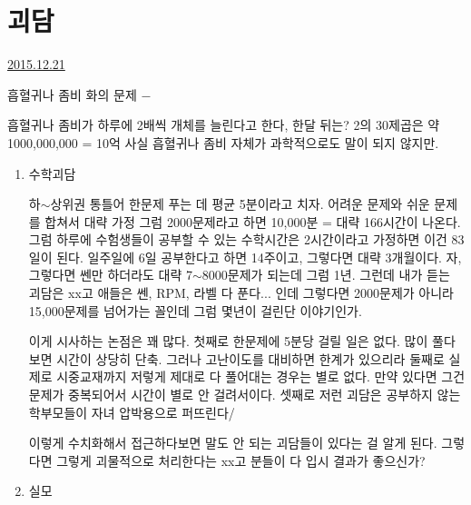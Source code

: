 


\section{괴담}
\href{https://www.kockoc.com/Apoc/556127}{2015.12.21}

\vspace{5mm}

흡혈귀나 좀비 화의 문제 $-$
\vspace{5mm}

흡혈귀나 좀비가 하루에 2배씩 개체를 늘린다고 한다, 한달 뒤는?
2의 30제곱은 약 1000,000,000 = 10억
사실 흡혈귀나 좀비 자체가 과학적으로도 말이 되지 않지만.
\vspace{5mm}
\begin{enumerate}

    \item 수학괴담
    \vspace{5mm}

    하$\sim$상위권 통틀어 한문제 푸는 데 평균 5분이라고 치자. 어려운 문제와 쉬운 문제를 합쳐서 대략 가정
    그럼 2000문제라고 하면 10,000분 = 대략 166시간이 나온다.
    그럼 하루에 수험생들이 공부할 수 있는 수학시간은 2시간이라고 가정하면 이건 83일이 된다.
    일주일에 6일 공부한다고 하면 14주이고, 그렇다면 대략 3개월이다.
    자, 그렇다면 쎈만 하더라도 대략 7$\sim$8000문제가 되는데 그럼 1년.
    그런데 내가 듣는 괴담은 xx고 애들은 쎈, RPM, 라벨 다 푼다... 인데
    그렇다면 2000문제가 아니라 15,000문제를 넘어가는 꼴인데 그럼 몇년이 걸린단 이야기인가.
    \vspace{5mm}

    이게 시사하는 논점은 꽤 많다.
    첫째로 한문제에 5분당 걸릴 일은 없다. 많이 풀다보면 시간이 상당히 단축. 그러나 고난이도를 대비하면 한계가 있으리라
    둘째로 실제로 시중교재까지 저렇게 제대로 다 풀어대는 경우는 별로 없다. 만약 있다면 그건 문제가 중복되어서 시간이 별로 안 걸려서이다.
    셋째로 저런 괴담은 공부하지 않는 학부모들이 자녀 압박용으로 퍼뜨린다/
    \vspace{5mm}

    이렇게 수치화해서 접근하다보면 말도 안 되는 괴담들이 있다는 걸 알게 된다.
    그렇다면 그렇게 괴물적으로 처리한다는 xx고 분들이 다 입시 결과가 좋으신가?
    \vspace{5mm}

    \item 실모
    \vspace{5mm}


\end{enumerate}
